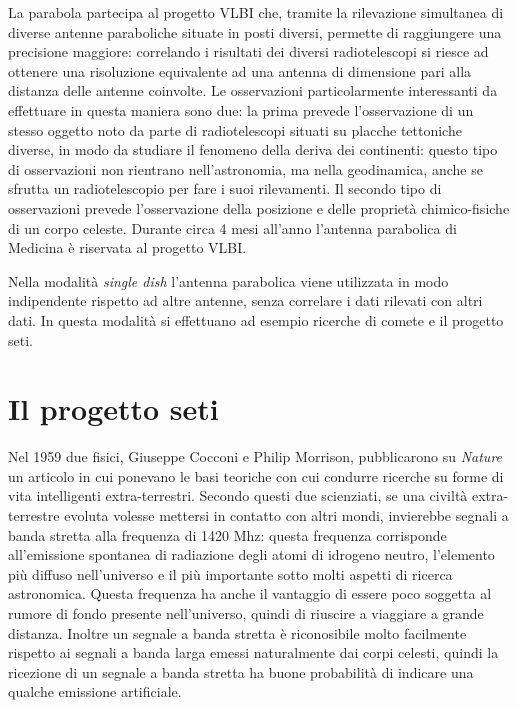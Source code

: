 La parabola partecipa al progetto \ac{VLBI} che, tramite la rilevazione
simultanea di diverse antenne paraboliche situate in posti diversi, permette di
raggiungere una precisione maggiore: correlando i risultati dei diversi
radiotelescopi si riesce ad ottenere una risoluzione equivalente ad una antenna
di dimensione pari alla distanza delle antenne coinvolte. Le osservazioni
particolarmente interessanti da effettuare in questa maniera sono due: la prima
prevede l'osservazione di un stesso oggetto noto da parte di radiotelescopi
situati su placche tettoniche diverse, in modo da studiare il fenomeno della
deriva dei continenti: questo tipo di osservazioni non rientrano
nell'astronomia, ma nella geodinamica, anche se sfrutta un radiotelescopio per
fare i suoi rilevamenti. Il secondo tipo di osservazioni prevede l'osservazione
della posizione e delle propriet\`a chimico-fisiche di un corpo celeste. Durante
circa 4 mesi all'anno l'antenna parabolica di Medicina \`e riservata al progetto
\ac{VLBI}.

Nella modalit\`a \emph{single dish} l'antenna parabolica viene utilizzata in
modo indipendente rispetto ad altre antenne, senza correlare i dati rilevati con
altri dati. In questa modalit\`a si effettuano ad esempio ricerche di comete e
il progetto \ac{seti}.

\section*{Il progetto \ac{seti}}
Nel 1959 due fisici, Giuseppe Cocconi e Philip Morrison, pubblicarono su
\emph{Nature} un articolo in cui ponevano le basi teoriche con cui condurre
ricerche su forme di vita intelligenti extra-terrestri. Secondo questi due
scienziati, se una civilt\`a extra-terrestre evoluta volesse mettersi in
contatto con altri mondi, invierebbe segnali a banda stretta alla frequenza di
1420 Mhz: questa frequenza corrisponde all'emissione spontanea di radiazione
degli atomi di idrogeno neutro, l'elemento pi\`u diffuso nell'universo e il
pi\`u importante sotto molti aspetti di ricerca astronomica. Questa frequenza ha
anche il vantaggio di essere poco soggetta al rumore di fondo presente
nell'universo, quindi di riuscire a viaggiare a grande distanza. Inoltre un
segnale a banda stretta \`e riconosibile molto facilmente rispetto ai segnali a
banda larga emessi naturalmente dai corpi celesti, quindi la ricezione di un
segnale a banda stretta ha buone probabilit\`a di indicare una qualche emissione
artificiale.

